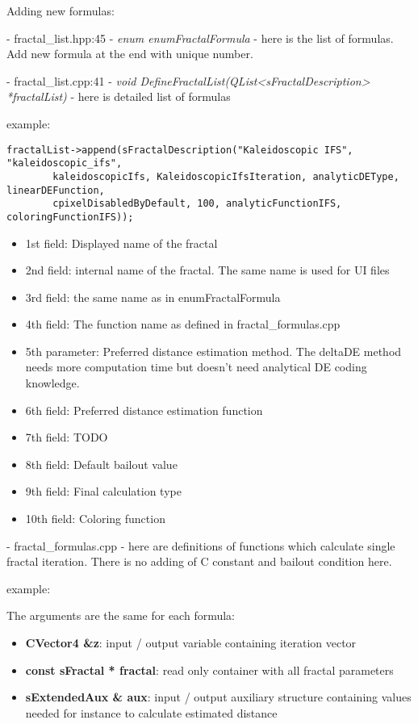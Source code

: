 Adding new formulas:

- fractal\_list.hpp:45 - \emph{enum enumFractalFormula} - here is the list of formulas. Add new formula at the end with unique number.

- fractal\_list.cpp:41 - \emph{void DefineFractalList(QList<sFractalDescription> *fractalList)} - here is detailed list of formulas

example:
\begin{lstlisting}
fractalList->append(sFractalDescription("Kaleidoscopic IFS", "kaleidoscopic_ifs",
		kaleidoscopicIfs, KaleidoscopicIfsIteration, analyticDEType, linearDEFunction,
		cpixelDisabledByDefault, 100, analyticFunctionIFS, coloringFunctionIFS));
\end{lstlisting}

\begin{itemize}
	\item 1st field: Displayed name of the fractal
	\item 2nd field: internal name of the fractal. The same name is used for UI files
	\item 3rd field: the same name as in enumFractalFormula
	\item 4th field: The function name as defined in fractal\_formulas.cpp
	\item 5th parameter: Preferred distance estimation method. The deltaDE method needs more computation time but doesn't need analytical DE coding knowledge.
	\item 6th field: Preferred distance estimation function
	\item 7th field: TODO
	\item 8th field: Default bailout value
	\item 9th field: Final calculation type
	\item 10th field: Coloring function
\end{itemize}

- fractal\_formulas.cpp - here are definitions of functions which calculate single fractal iteration. There is no adding of C constant and bailout condition here.

example:


The arguments are the same for each formula:
\begin{itemize}
	\item \textbf{CVector4 \&z}: input / output variable containing iteration vector
	\item \textbf{const sFractal * fractal}: read only container with all fractal parameters
	\item \textbf{sExtendedAux \& aux}: input / output auxiliary structure containing values 
		needed for instance to calculate estimated distance
\end{itemize}

